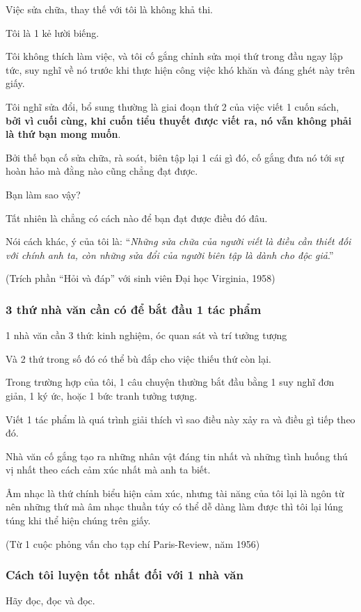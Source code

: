 \documentclass{article}
\begin{document}
Việc sửa chữa, thay thế với tôi là không khả thi.

Tôi là 1 kẻ lười biếng.

Tôi không thích làm việc, và tôi cố gắng chỉnh sửa mọi thứ trong đầu ngay lập tức, suy nghĩ về nó trước khi thực hiện công việc khó khăn và đáng ghét này trên giấy.

Tôi nghĩ sửa đổi, bổ sung thường là giai đoạn thứ 2 của việc viết 1 cuốn sách,\textbf{ bởi vì cuối cùng, khi cuốn tiểu thuyết được viết ra, nó vẫn không phải là thứ bạn mong muốn}.

Bởi thế bạn cố sửa chữa, rà soát, biên tập lại 1 cái gì đó, cố gắng đưa nó tới sự hoàn hảo mà đằng nào cũng chẳng đạt được.

Bạn làm sao vậy?

Tất nhiên là chẳng có cách nào để bạn đạt được điều đó đâu.

Nói cách khác, ý của tôi là: ``\textit{Những sửa chữa của người viết là điều cần thiết đối với chính anh ta, còn những sửa đổi của người biên tập là dành cho độc giả}.''

(Trích phần ``Hỏi và đáp'' với sinh viên Đại học Virginia, 1958)

\subsubsection{3 thứ nhà văn cần có để bắt đầu 1 tác phẩm}
1 nhà văn cần 3 thứ: kinh nghiệm, óc quan sát và trí tưởng tượng

Và 2 thứ trong số đó có thể bù đắp cho việc thiếu thứ còn lại.

Trong trường hợp của tôi, 1 câu chuyện thường bắt đầu bằng 1 suy nghĩ đơn giản, 1 ký ức, hoặc 1 bức tranh tưởng tượng.

Viết 1 tác phẩm là quá trình giải thích vì sao điều này xảy ra và điều gì tiếp theo đó.

Nhà văn cố gắng tạo ra những nhân vật đáng tin nhất và những tình huống thú vị nhất theo cách cảm xúc nhất mà anh ta biết.

Âm nhạc là thứ chính biểu hiện cảm xúc, nhưng tài năng của tôi lại là ngôn từ nên những thứ mà âm nhạc thuần túy có thể dễ dàng làm được thì tôi lại lúng túng khi thể hiện chúng trên giấy.

(Từ 1 cuộc phỏng vấn cho tạp chí Paris-Review, năm 1956)

\subsubsection{Cách tôi luyện tốt nhất đối với 1 nhà văn}
Hãy đọc, đọc và đọc.
\end{document}
